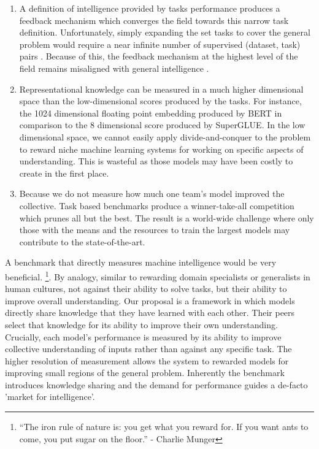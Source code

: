 \documentclass{article}
\begin{document}
\begin{enumerate}
	\item A definition of intelligence provided by tasks performance produces a feedback mechanism which converges the field towards this narrow task definition. Unfortunately, simply expanding the set tasks to cover the general problem would require a near infinite number of supervised (dataset, task) pairs \cite{radford2019language}. Because of this, the feedback mechanism at the highest level of the field remains misaligned with general intelligence \cite{chollet2019measure}. 
	
	\item Representational knowledge can be measured in a much higher dimensional space than the low-dimensional scores produced by the tasks. For instance, the 1024 dimensional floating point embedding produced by BERT in comparison to the 8 dimensional score produced by SuperGLUE. In the low dimensional space, we cannot easily apply divide-and-conquer to the problem to reward niche machine learning systems for working on specific aspects of understanding. This is wasteful as those models may have been costly to create in the first place.
	
	\item Because we do not measure how much one team's model improved the collective. Task based benchmarks produce a winner-take-all competition which prunes all but the best. The result is a world-wide challenge where only those with the means and the resources to train the largest models may contribute to the state-of-the-art. 
\end{enumerate}


A benchmark that directly measures machine intelligence would be very beneficial.  \footnote{“The iron rule of nature is: you get what you reward for. If you want ants to come, you put sugar on the floor.” - Charlie Munger}. By analogy, similar to rewarding domain specialists or generalists in human cultures, not against their ability to solve tasks, but their ability to improve overall understanding. Our proposal is a framework in which models directly share knowledge that they have learned with each other. Their peers select that knowledge for its ability to improve their own understanding. Crucially, each model's performance is measured by its ability to improve collective understanding of inputs rather than against any specific task. The higher resolution of measurement allows the system to rewarded models for improving small regions of the general problem. Inherently the benchmark introduces knowledge sharing and the demand for performance guides a de-facto 'market for intelligence'.   
\smallskip
\end{document}
